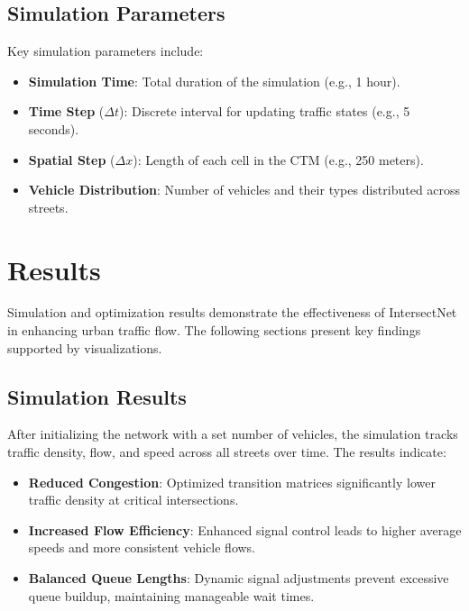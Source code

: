 \documentclass[conference]{IEEEtran}
\begin{document}
\subsection{Simulation Parameters}
Key simulation parameters include:
\begin{itemize}
    \item \textbf{Simulation Time}: Total duration of the simulation (e.g., 1 hour).
    \item \textbf{Time Step} ($\Delta t$): Discrete interval for updating traffic states (e.g., 5 seconds).
    \item \textbf{Spatial Step} ($\Delta x$): Length of each cell in the CTM (e.g., 250 meters).
    \item \textbf{Vehicle Distribution}: Number of vehicles and their types distributed across streets.
\end{itemize}

\section{Results}

Simulation and optimization results demonstrate the effectiveness of IntersectNet in enhancing urban traffic flow. The following sections present key findings supported by visualizations.

\subsection{Simulation Results}
After initializing the network with a set number of vehicles, the simulation tracks traffic density, flow, and speed across all streets over time. The results indicate:
\begin{itemize}
    \item \textbf{Reduced Congestion}: Optimized transition matrices significantly lower traffic density at critical intersections.
    \item \textbf{Increased Flow Efficiency}: Enhanced signal control leads to higher average speeds and more consistent vehicle flows.
    \item \textbf{Balanced Queue Lengths}: Dynamic signal adjustments prevent excessive queue buildup, maintaining manageable wait times.
\end{itemize}
\end{document}
